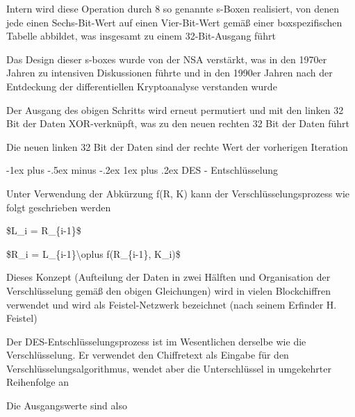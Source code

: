 \documentclass[a4paper]{article}
\makeatletter
\renewcommand{\subsubsection}{\@startsection{subsubsection}{3}{0mm}%
 {-1ex plus -.5ex minus -.2ex}%
 {1ex plus .2ex}%
 {\normalfont\small\bfseries}}
\makeatother
\begin{document}
\begin{multicols}{3}
\begin{itemize*}
            \begin{itemize*}
                  \item Intern wird diese Operation durch 8 so genannte s-Boxen realisiert, von denen jede einen Sechs-Bit-Wert auf einen Vier-Bit-Wert gemäß einer boxspezifischen Tabelle abbildet, was insgesamt zu einem 32-Bit-Ausgang führt
                  \item Das Design dieser s-boxes wurde von der NSA verstärkt, was in den 1970er Jahren zu intensiven Diskussionen führte und in den 1990er Jahren nach der Entdeckung der differentiellen Kryptoanalyse verstanden wurde
            \end{itemize*}
            \item
            Der Ausgang des obigen Schritts wird erneut permutiert und mit den
            linken 32 Bit der Daten XOR-verknüpft, was zu den neuen rechten 32 Bit
            der Daten führt
            \item
            Die neuen linken 32 Bit der Daten sind der rechte Wert der vorherigen
            Iteration
      \end{itemize*}


      \subsubsection{DES - Entschlüsselung}

      \begin{itemize*}
            \item
            Unter Verwendung der Abkürzung f(R, K) kann der
            Verschlüsselungsprozess wie folgt geschrieben werden

            \begin{itemize*}
                  \item \$L\_i = R\_\{i-1\}\$
                  \item \$R\_i = L\_\{i-1\}\textbackslash oplus f(R\_\{i-1\}, K\_i)\$
                  \item Dieses Konzept (Aufteilung der Daten in zwei Hälften und Organisation der Verschlüsselung gemäß den obigen Gleichungen) wird in vielen Blockchiffren verwendet und wird als Feistel-Netzwerk bezeichnet (nach seinem Erfinder H. Feistel)
            \end{itemize*}
            \item
            Der DES-Entschlüsselungsprozess ist im Wesentlichen derselbe wie die
            Verschlüsselung. Er verwendet den Chiffretext als Eingabe für den
            Verschlüsselungsalgorithmus, wendet aber die Unterschlüssel in
            umgekehrter Reihenfolge an
            \item
            Die Ausgangswerte sind also


\end{itemize*}
\end{multicols}
\end{document}
